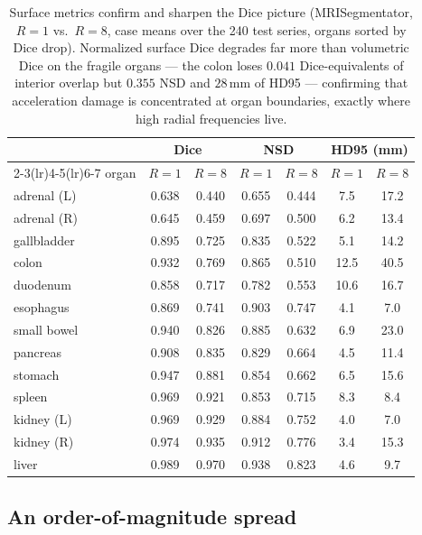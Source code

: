 \documentclass[10pt,twocolumn,letterpaper]{article}
\begin{document}
\begin{table}[t]\centering\small
\caption{Surface metrics confirm and sharpen the Dice picture (MRISegmentator, $R{=}1$ vs.\ $R{=}8$,
case means over the 240 test series, organs sorted by Dice drop). Normalized surface Dice degrades
far more than volumetric Dice on the fragile organs --- the colon loses $0.041$ Dice-equivalents of
interior overlap but $0.355$ NSD and $28$\,mm of HD95 --- confirming that acceleration damage is
concentrated at organ boundaries, exactly where high radial frequencies live.}
\label{tab:surface}
\begin{tabular}{@{}lcccccc@{}}
\toprule
& \multicolumn{2}{c}{Dice} & \multicolumn{2}{c}{NSD} & \multicolumn{2}{c}{HD95 (mm)}\\
\cmidrule(lr){2-3}\cmidrule(lr){4-5}\cmidrule(lr){6-7}
organ & $R{=}1$ & $R{=}8$ & $R{=}1$ & $R{=}8$ & $R{=}1$ & $R{=}8$\\
\midrule
adrenal (L) & 0.638 & 0.440 & 0.655 & 0.444 & 7.5 & 17.2\\
adrenal (R) & 0.645 & 0.459 & 0.697 & 0.500 & 6.2 & 13.4\\
gallbladder & 0.895 & 0.725 & 0.835 & 0.522 & 5.1 & 14.2\\
colon & 0.932 & 0.769 & 0.865 & 0.510 & 12.5 & 40.5\\
duodenum & 0.858 & 0.717 & 0.782 & 0.553 & 10.6 & 16.7\\
esophagus & 0.869 & 0.741 & 0.903 & 0.747 & 4.1 & 7.0\\
small bowel & 0.940 & 0.826 & 0.885 & 0.632 & 6.9 & 23.0\\
pancreas & 0.908 & 0.835 & 0.829 & 0.664 & 4.5 & 11.4\\
stomach & 0.947 & 0.881 & 0.854 & 0.662 & 6.5 & 15.6\\
spleen & 0.969 & 0.921 & 0.853 & 0.715 & 8.3 & 8.4\\
kidney (L) & 0.969 & 0.929 & 0.884 & 0.752 & 4.0 & 7.0\\
kidney (R) & 0.974 & 0.935 & 0.912 & 0.776 & 3.4 & 15.3\\
liver & 0.989 & 0.970 & 0.938 & 0.823 & 4.6 & 9.7\\
\bottomrule
\end{tabular}
\end{table}

\subsection{An order-of-magnitude spread}
\end{document}
